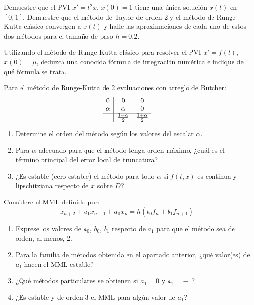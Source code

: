 \begin{ejercicio}\label{ej:3.1.8}
    Demuestre que el PVI $x' = t^2 x$, $x(0) = 1$ tiene una única solución $x(t)$ en $[0, 1]$. Demuestre que el método de Taylor de orden 2 y el método de Runge-Kutta clásico convergen a $x(t)$ y halle las aproximaciones de cada uno de estos dos métodos para el tamaño de paso $h = 0.2$.
\end{ejercicio}

\begin{ejercicio}\label{ej:3.1.9}
    Utilizando el método de Runge-Kutta clásico para resolver el PVI $x' = f(t)$, $x(0) = \mu$, deduzca una conocida fórmula de integración numérica e indique de qué fórmula se trata.
\end{ejercicio}

\begin{ejercicio}\label{ej:3.1.10}
    Para el método de Runge-Kutta de 2 evaluaciones con arreglo de Butcher:
    \begin{equation*}
        \begin{array}{c|cc}
            0 & 0 & 0 \\ 
            \alpha & \alpha & 0 \\ \hline
             & \frac{1-\alpha}{2} & \frac{1+\alpha}{2}
        \end{array}
    \end{equation*}
    \begin{enumerate}
        \item Determine el orden del método según los valores del escalar $\alpha$.
        \item Para $\alpha$ adecuado para que el método tenga orden máximo, ¿cuál es el término principal del error local de truncatura?
        \item ¿Es estable (cero-estable) el método para todo $\alpha$ si $f(t, x)$ es continua y lipschitziana respecto de $x$ sobre $D$?
    \end{enumerate}
\end{ejercicio}

\begin{ejercicio}
    Considere el MML definido por:
    \begin{equation*}
        x_{n+2} + a_1 x_{n+1} + a_0 x_n = h (b_0 f_n + b_1 f_{n+1})
    \end{equation*}
    \begin{enumerate}
        \item Exprese los valores de $a_0$, $b_0$, $b_1$ respecto de $a_1$ para que el método sea de orden, al menos, 2.
        \item Para la familia de métodos obtenida en el apartado anterior, ¿qué valor(es) de $a_1$ hacen el MML estable?
        \item ¿Qué métodos particulares se obtienen si $a_1 = 0$ y $a_1 = -1$?
        \item ¿Es estable y de orden 3 el MML para algún valor de $a_1$?
    \end{enumerate}
\end{ejercicio}

